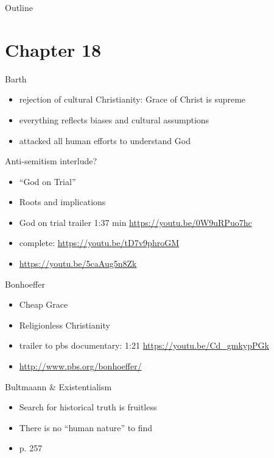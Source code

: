 

\maketitle
\begin{frame}{Outline}
\setcounter{tocdepth}{1}
\tableofcontents
\end{frame}

\section{Chapter 18}
\label{sec-1}
\begin{frame}[label=sec-1-1]{Barth}
\begin{itemize}
\item rejection of cultural Christianity: Grace of Christ is supreme
\item everything reflects biases and cultural assumptions
\item attacked all human efforts to understand God
\end{itemize}
\end{frame}

\begin{frame}[label=sec-1-2]{Anti-semitism interlude?}
\begin{itemize}
\item ``God on Trial''
\item Roots and implications
\item God on trial trailer 1:37 min \url{https://youtu.be/0W9uRPuo7hc}
\item complete: \url{https://youtu.be/tD7v9phroGM}
\item \url{https://youtu.be/5caAug5n8Zk}
\end{itemize}
\end{frame}

\begin{frame}[label=sec-1-3]{Bonhoeffer}
\begin{itemize}
\item Cheap Grace
\item Religionless Christianity
\item trailer to pbs documentary: 1:21 \url{https://youtu.be/Cd_gmkypPGk}
\item \url{http://www.pbs.org/bonhoeffer/}
\end{itemize}
\end{frame}

\begin{frame}[label=sec-1-4]{Bultmaann \& Existentialism}
\begin{itemize}
\item Search for historical truth is fruitless
\item There is no ``human nature'' to find
\item p. 257
\end{itemize}
\end{frame}


